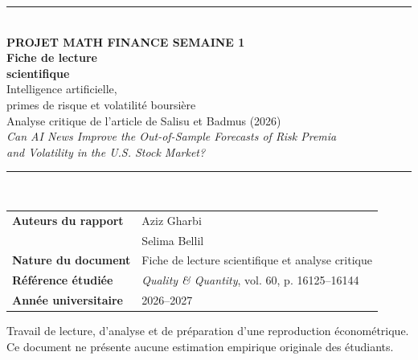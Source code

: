 \documentclass[11pt,a4paper]{article}
\begin{document}
\begin{titlepage}
\thispagestyle{empty}
\vspace*{2.0cm}
{\color{teal}\rule{\textwidth}{1.7pt}}\\[0.55cm]
{\large\bfseries\color{teal} PROJET MATH FINANCE \quad\textbar\quad SEMAINE 1}\\[1.1cm]
{\Huge\bfseries\color{navy} Fiche de lecture\\[0.20cm] scientifique}\\[0.55cm]
{\LARGE\color{navy} Intelligence artificielle,\\ primes de risque et volatilité boursière}\\[0.95cm]
{\large Analyse critique de l'article de Salisu et Badmus (2026)}\\[0.28cm]
{\itshape Can AI News Improve the Out-of-Sample Forecasts of Risk Premia\\ and Volatility in the U.S. Stock Market?}\\[1.0cm]
{\color{teal}\rule{\textwidth}{1.0pt}}\\[0.9cm]
\begin{tabularx}{\textwidth}{@{}>{\bfseries}p{4.5cm}X@{}}
Auteurs du rapport & Aziz Gharbi\\[0.12cm]
& Selima Bellil\\[0.34cm]
Nature du document & Fiche de lecture scientifique et analyse critique\\[0.20cm]
Référence étudiée & \textit{Quality \& Quantity}, vol. 60, p. 16125--16144\\[0.20cm]
Année universitaire & 2026--2027\\
\end{tabularx}
\vfill
{\small\color{grey} Travail de lecture, d'analyse et de préparation d'une reproduction économétrique.\\
Ce document ne présente aucune estimation empirique originale des étudiants.}
\end{titlepage}

\setcounter{tocdepth}{1}
\tableofcontents
\clearpage
\end{document}
